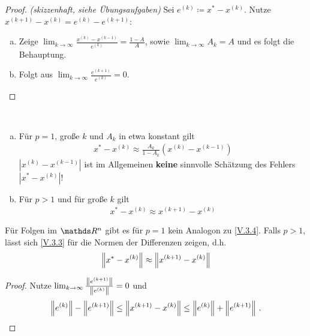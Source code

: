 \begin{proof}
  \textit{(skizzenhaft, siehe Übungsaufgaben)}
  Sei $e^{(k)}\coloneqq x^{*}-x^{(k)}$.
  Nutze $x^{(k+1)}-x^{(k)} = e^{(k)}-e^{(k+1)}$:
  \begin{enumerate}[a)]
  \item Zeige
    $\lim_{k\to\infty}\frac{x^{(k)}-x^{(k-1)}}{e^{(k)}} = \frac{1-A}{A}$,
    sowie $\lim_{k\to \infty}A_k = A$ und es folgt die Behauptung.
  \item Folgt aus $\lim_{k\to\infty} \frac{e^{(k+1)}}{e^{(k)}} =0$.
  \end{enumerate}
\end{proof}

\begin{Fole}~
  \begin{enumerate}[a)]
  \item Für $p=1$, große $k$ und $A_k$ in etwa konstant gilt
    \begin{gather}
      x^{*}-x^{(k)} \approx \frac{A_k}{1-A_k}(x^{(k)}-x^{(k-1)})
      \label{V.3.4}
    \end{gather}
    $|x^{(k)}-x^{(k-1)}|$ ist im Allgemeinen \textbf{keine} sinnvolle Schätzung
    des Fehlers $|x^{*}-x^{(k)}|$!
  \item Für $p>1$ und für große $k$ gilt
    \begin{gather}
      x^{*}-x^{(k)} \approx x^{(k+1)}-x^{(k)}
      \label{V.3.5}
    \end{gather}
  \end{enumerate}
\end{Fole}


\begin{Beme}
  Für Folgen im $\R^n$ gibt es für $p=1$ kein Analogon zu \eqref{V.3.4}.
  Falls $p>1$, lässt sich \eqref{V.3.3} für die Normen der Differenzen zeigen,
  d.h.
  \begin{gather}
    \nn[x^{*}-x^{(k)}] \approx \nn[x^{(k+1)}-x^{(k)}]
    \label{V.3.6}
  \end{gather}
  
  \begin{proof}
    Nutze $\lim_{k\to\infty} \frac{\nn[e^{(k+1)}]}{\nn[e^{(k)}]} =0$ und 
    \begin{gather*}
      \nn[e^{(k)}]-\nn[e^{(k+1)}]
      \leq \nn[x^{(k+1)}-x^{(k)}] 
      \leq \nn[e^{(k)}]+\nn[e^{(k+1)}] \, .
    \end{gather*}
  \end{proof}
\end{Beme}


